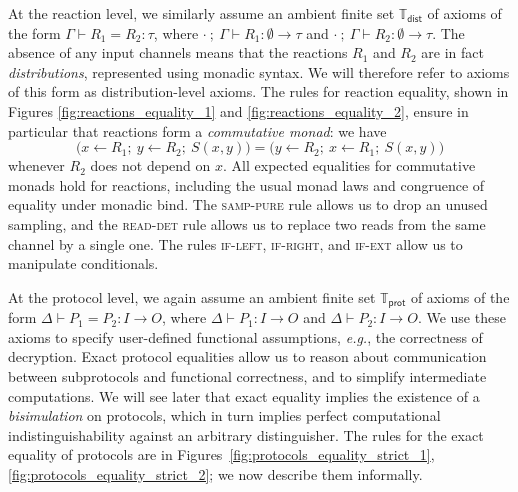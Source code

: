 At the reaction level, we similarly assume an ambient finite set $\mathbb{T}_\mathsf{dist}$ of axioms of the form $\Gamma \vdash R_1 = R_2 : \tau$, where $\cdot \ ; \ \Gamma \vdash R_1 : \emptyset \to \tau$ and $\cdot \ ; \ \Gamma \vdash R_2 : \emptyset \to \tau$. The absence of any input channels means that the reactions $R_1$ and $R_2$ are in fact \emph{distributions}, represented using monadic syntax. We will therefore refer to axioms of this form as distribution-level axioms. The rules for reaction equality, shown in Figures \ref{fig:reactions_equality_1} and \ref{fig:reactions_equality_2}, ensure in particular that reactions form a \emph{commutative monad}: we have \[\big(x \leftarrow R_1; \ y \leftarrow R_2; \ S(x,y)\big) = \big(y \leftarrow R_2; \ x \leftarrow R_1; \ S(x,y)\big)\] whenever $R_2$ does not depend on $x$. All expected equalities for commutative monads hold for reactions, including the usual monad laws and congruence of equality under monadic bind. The \textsc{samp-pure} rule allows us to drop an unused sampling, and the \textsc{read-det} rule allows us to replace two reads from the same channel by a single one. The rules \textsc{if-left}, \textsc{if-right}, and \textsc{if-ext} allow us to manipulate conditionals.

At the protocol level, we again assume an ambient finite set $\mathbb{T}_\mathsf{prot}$ of axioms of the form $\Delta \vdash P_1 = P_2 : I \to O$, where $\Delta \vdash P_1 : I \to O$ and $\Delta \vdash P_2 : I \to O$. We use these axioms to specify user-defined functional assumptions, \emph{e.g.}, the correctness of decryption. Exact protocol equalities allow us to reason about communication between subprotocols and functional correctness, and to simplify intermediate computations. We will see later that exact equality implies the existence of a \emph{bisimulation} on protocols, which in turn implies perfect computational indistinguishability against an arbitrary distinguisher. The rules for the exact equality of protocols are in Figures~\ref{fig:protocols_equality_strict_1}, \ref{fig:protocols_equality_strict_2}; we now describe them informally.

